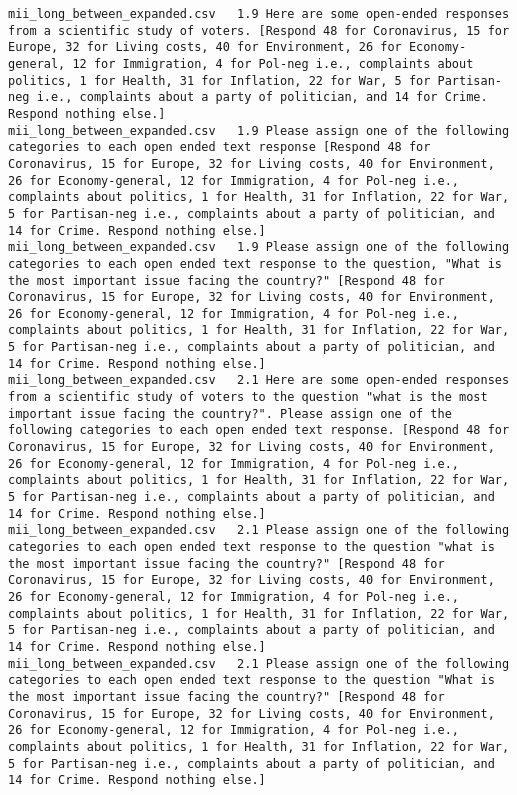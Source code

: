 \begin{lstlisting}[label=lst:promptvariants]
mii_long_between_expanded.csv	1.9	Here are some open-ended responses from a scientific study of voters. [Respond 48 for Coronavirus, 15 for Europe, 32 for Living costs, 40 for Environment, 26 for Economy-general, 12 for Immigration, 4 for Pol-neg i.e., complaints about politics, 1 for Health, 31 for Inflation, 22 for War, 5 for Partisan-neg i.e., complaints about a party of politician, and 14 for Crime. Respond nothing else.]
mii_long_between_expanded.csv	1.9	Please assign one of the following categories to each open ended text response [Respond 48 for Coronavirus, 15 for Europe, 32 for Living costs, 40 for Environment, 26 for Economy-general, 12 for Immigration, 4 for Pol-neg i.e., complaints about politics, 1 for Health, 31 for Inflation, 22 for War, 5 for Partisan-neg i.e., complaints about a party of politician, and 14 for Crime. Respond nothing else.]
mii_long_between_expanded.csv	1.9	Please assign one of the following categories to each open ended text response to the question, "What is the most important issue facing the country?" [Respond 48 for Coronavirus, 15 for Europe, 32 for Living costs, 40 for Environment, 26 for Economy-general, 12 for Immigration, 4 for Pol-neg i.e., complaints about politics, 1 for Health, 31 for Inflation, 22 for War, 5 for Partisan-neg i.e., complaints about a party of politician, and 14 for Crime. Respond nothing else.]
mii_long_between_expanded.csv	2.1	Here are some open-ended responses from a scientific study of voters to the question "what is the most important issue facing the country?". Please assign one of the following categories to each open ended text response. [Respond 48 for Coronavirus, 15 for Europe, 32 for Living costs, 40 for Environment, 26 for Economy-general, 12 for Immigration, 4 for Pol-neg i.e., complaints about politics, 1 for Health, 31 for Inflation, 22 for War, 5 for Partisan-neg i.e., complaints about a party of politician, and 14 for Crime. Respond nothing else.]
mii_long_between_expanded.csv	2.1	Please assign one of the following categories to each open ended text response to the question "what is the most important issue facing the country?" [Respond 48 for Coronavirus, 15 for Europe, 32 for Living costs, 40 for Environment, 26 for Economy-general, 12 for Immigration, 4 for Pol-neg i.e., complaints about politics, 1 for Health, 31 for Inflation, 22 for War, 5 for Partisan-neg i.e., complaints about a party of politician, and 14 for Crime. Respond nothing else.]
mii_long_between_expanded.csv	2.1	Please assign one of the following categories to each open ended text response to the question "What is the most important issue facing the country?" [Respond 48 for Coronavirus, 15 for Europe, 32 for Living costs, 40 for Environment, 26 for Economy-general, 12 for Immigration, 4 for Pol-neg i.e., complaints about politics, 1 for Health, 31 for Inflation, 22 for War, 5 for Partisan-neg i.e., complaints about a party of politician, and 14 for Crime. Respond nothing else.]

\end{lstlisting}
